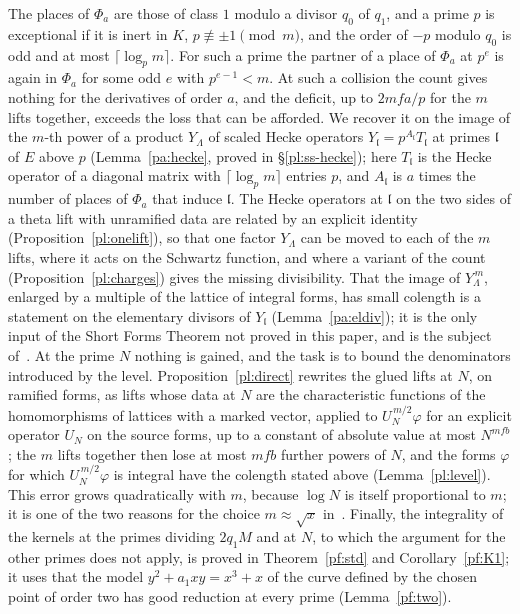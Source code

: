 \documentclass[10pt]{amsart}
\theoremstyle{definition}
\theoremstyle{remark}
\providecommand{\auPa}{\Phi_a}
\begin{document}
The places of $\auPa$ are those of class $1$ modulo a divisor $q_0$ of $q_1$, and a prime $p$ is
exceptional if it is inert in $K$, $p\not\equiv\pm1\pmod m$, and the order of $-p$ modulo $q_0$ is
odd and at most $\lceil\log_pm\rceil$. For such a prime the partner of a place of $\auPa$ at $p^e$
is again in $\auPa$ for some odd $e$ with $p^{e-1}<m$. At such a collision the count gives nothing
for the derivatives of order $a$, and the deficit, up to $2mfa/p$ for the $m$ lifts together,
exceeds the loss that can be afforded. We recover it on the image of the $m$-th
power of a product $Y_\Lambda$ of scaled Hecke operators $Y_{\mathfrak l}=p^{A_{\mathfrak l}}
T_{\mathfrak l}$ at primes $\mathfrak l$ of $E$ above $p$ (Lemma~\ref{pa:hecke}, proved in
\S\ref{pl:ss-hecke}); here $T_{\mathfrak l}$ is the Hecke operator of a diagonal matrix with
$\lceil\log_pm\rceil$ entries $p$, and $A_{\mathfrak l}$ is $a$ times the number of places of
$\auPa$ that induce $\mathfrak l$. The Hecke operators at $\mathfrak l$ on the two sides of a theta
lift with unramified data are related by an explicit identity
(Proposition~\ref{pl:onelift}), so that one factor $Y_\Lambda$ can be moved to each of the $m$
lifts, where it acts on the Schwartz function, and where a variant of the count
(Proposition~\ref{pl:charges}) gives the missing divisibility. That the image of $Y_\Lambda^{\,m}$, enlarged by a multiple of the lattice of
integral forms, has small colength is a statement on the elementary divisors of
$Y_{\mathfrak l}$ (Lemma~\ref{pa:eldiv}); it is the only input of the Short Forms Theorem not
proved in this paper, and is the subject of~\cite{P50}. At the prime $N$ nothing is gained, and
the task is to bound the denominators introduced by the level. Proposition~\ref{pl:direct}
rewrites the glued lifts at $N$, on ramified forms, as lifts whose data at $N$ are the
characteristic functions of the homomorphisms of lattices with a marked vector, applied to
$U_N^{\,m/2}\varphi$ for an explicit operator $U_N$ on the source forms, up to a constant of
absolute value at most $N^{mfb}$; the $m$ lifts together then lose at most $mfb$ further powers of
$N$, and the forms $\varphi$ for which $U_N^{\,m/2}\varphi$ is integral have the colength stated
above (Lemma~\ref{pl:level}). This error grows quadratically with $m$, because $\log N$ is itself
proportional to $m$; it is one of the two reasons for the choice $m\approx\sqrt x$
in~\cite{P46}. Finally, the integrality of the kernels at the primes dividing $2q_1M$ and at $N$,
to which the argument for the other primes does not apply, is
proved in Theorem~\ref{pf:std} and Corollary~\ref{pf:K1}; it uses that the model
$y^2+a_1xy=x^3+x$ of the curve defined by the chosen point of order two has good reduction at
every prime (Lemma~\ref{pf:two}).
\end{document}
